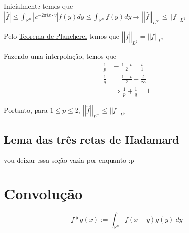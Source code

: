 \documentclass[11pt]{article}
\newcommand{\Rn}{{\mathbb{R}^n}}
\newcommand{\norm}[2]{\left|\left|#1\right|\right|_{L^{#2}}}
\begin{document}
Inicialmente temos que \( |\hat{f}| \leq \int_\Rn \left| e^{-2\pi i x \cdot y} \right| f(y) dy \leq \int_\Rn f(y) dy \Rightarrow \norm{\hat{f}}{\infty} \leq \norm{f}{1}\)

Pelo \href{https://en.wikipedia.org/wiki/Plancherel_theorem}{Teorema de Plancherel} temos que \( \norm{\hat{f}}{2} = \norm{f}{2} \)

Fazendo uma interpolação, temos que \begin{align*}
	\frac{1}{p} &= \frac{1-t}{2} + \frac{t}{1} \\
	\frac{1}{q} &= \frac{1-t}{2} + \frac{t}{\infty} \\
	&\Rightarrow \frac{1}{p} + \frac{1}{q} = 1
\end{align*}

Portanto, para \( 1\leq p \leq 2 \), \( \norm{\hat{f}}{p'} \leq \norm{f}{p} \)


\subsection{Lema das três retas de Hadamard}
vou deixar essa seção vazia por enquanto :p





























\section{Convolução}
\[ f*g(x) := \int_\Rn f(x-y)g(y)\ dy\]
\end{document}
